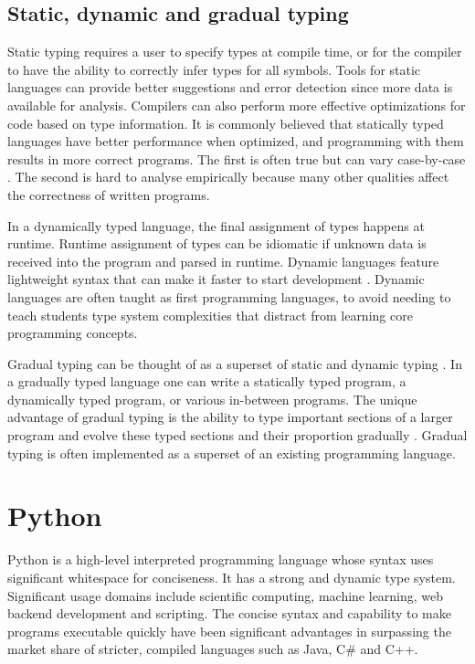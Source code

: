 \subsection{Static, dynamic and gradual typing}
Static typing requires a user to specify types at compile time, or for the compiler to have the ability to correctly infer types for all symbols. Tools for static languages can provide better suggestions and error detection since more data is available for analysis. Compilers can also perform more effective optimizations for code based on type information. It is commonly believed that statically typed languages have better performance when optimized, and programming with them results in more correct programs. The first is often true but can vary case-by-case \cite{nanz_comparative_2015}. The second is hard to analyse empirically \cite{codequality_reproudction_2019} because many other qualities affect the correctness of written programs. 

In a dynamically typed language, the final assignment of types happens at runtime. Runtime assignment of types can be idiomatic if unknown data is received into the program and parsed in runtime. Dynamic languages feature lightweight syntax that can make it faster to start development \cite{di_grazia_evolution_2022}. Dynamic languages are often taught as first programming languages, to avoid needing to teach students type system complexities that distract from learning core programming concepts.


Gradual typing can be thought of as a superset of static and dynamic typing \cite{siek_refined_gradual_2015}. In a gradually typed language one can write a statically typed program, a dynamically typed program, or various in-between programs. The unique advantage of gradual typing is the ability to type important sections of a larger program and evolve these typed sections and their proportion gradually \cite{siek_refined_gradual_2015}. Gradual typing is often implemented as a superset of an existing programming language.

\section{Python}
Python is a high-level interpreted programming language whose syntax uses significant whitespace for conciseness. It has a strong and dynamic type system. Significant usage domains include scientific computing, machine learning, web backend development and scripting. The concise syntax and capability to make programs executable quickly have been significant advantages in surpassing the market share of stricter, compiled languages such as Java, C\# and C++.


